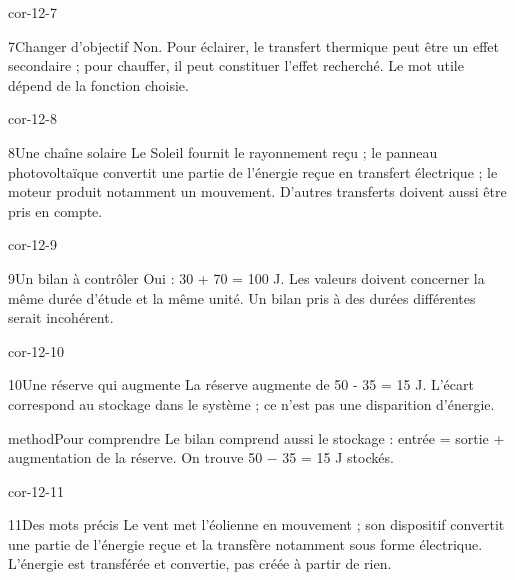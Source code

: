 \documentclass[12pt,twoside,openany]{book}
\begin{document}
\begin{blocLivre}{cor-12-7}
\begin{corrige}{7}{Changer d’objectif}
Non. Pour éclairer, le transfert thermique peut être un effet secondaire ; pour chauffer, il peut constituer l’effet recherché. Le mot utile dépend de la fonction choisie.\par
\end{corrige}\end{blocLivre}
\begin{blocLivre}{cor-12-8}
\begin{corrige}{8}{Une chaîne solaire}
Le Soleil fournit le rayonnement reçu ; le panneau photovoltaïque convertit une partie de l’énergie reçue en transfert électrique ; le moteur produit notamment un mouvement. D’autres transferts doivent aussi être pris en compte.\par
\end{corrige}\end{blocLivre}
\begin{blocLivre}{cor-12-9}
\begin{corrige}{9}{Un bilan à contrôler}
Oui : 30 + 70 = 100 J. Les valeurs doivent concerner la même durée d’étude et la même unité. Un bilan pris à des durées différentes serait incohérent.\par
{}
\end{corrige}\end{blocLivre}
\begin{blocLivre}{cor-12-10}
\begin{corrige}{10}{Une réserve qui augmente}
La réserve augmente de 50 - 35 = 15 J. L’écart correspond au stockage dans le système ; ce n’est pas une disparition d’énergie.\par
\begin{pcEncadre}{method}{Pour comprendre}
Le bilan comprend aussi le stockage : entrée = sortie + augmentation de la réserve. On trouve 50 − 35 = 15 J stockés.\par
\end{pcEncadre}
\end{corrige}\end{blocLivre}
\begin{blocLivre}{cor-12-11}
\begin{corrige}{11}{Des mots précis}
Le vent met l’éolienne en mouvement ; son dispositif convertit une partie de l’énergie reçue et la transfère notamment sous forme électrique. L’énergie est transférée et convertie, pas créée à partir de rien.\par
\end{corrige}\end{blocLivre}
\end{document}
